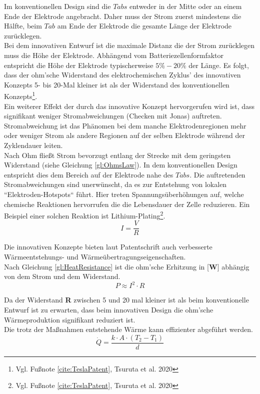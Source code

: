 Im konventionellen Design sind die $Tabs$ entweder in der Mitte oder an einem Ende der Elektrode angebracht. Daher muss der Strom zuerst mindestens die Hälfte, beim $Tab$ am Ende der Elektrode die gesamte Länge der Elektrode zurücklegen. \\
Bei dem innovativen Entwurf ist die maximale Distanz die der Strom zurücklegen muss die Höhe der Elektrode. Abhängend vom Batteriezellenformfaktor entspricht die Höhe der Elektrode typischerweise $5\percent-20\percent$ der Länge. Es folgt, dass der ohm'sche Widerstand des elektrochemischen Zyklus' des innovativen Konzepts 5- bis 20-Mal kleiner ist als der Widerstand des konventionellen Konzepts\footnote{Vgl. Fußnote \ref{cite:TeslaPatent}, Tsuruta et al. 2020}.\\
Ein weiterer Effekt der durch das innovative Konzept hervorgerufen wird ist, dass signifikant weniger Stromabweichungen (Checken mit Jonas) auftreten. Stromabweichung ist das Phänomen bei dem manche Elektrodenregionen mehr oder weniger Strom als andere Regionen auf der selben Elektrode während der Zyklendauer leiten.\\
Nach Ohm fließt Strom bevorzugt entlang der Strecke mit dem geringsten Widerstand (siehe Gleichung \ref{gl:OhmsLaw}). In dem konventionellen Design entspricht dies dem Bereich auf der Elektrode nahe des $Tabs$. Die auftretenden Stromabweichungen sind unerwünscht, da es zur Entstehung von lokalen ``Elektroden-Hotspots`` führt. Hier treten Spannungsüberhöhungen auf, welche chemische Reaktionen hervorrufen die die Lebensdauer der Zelle reduzieren. Ein Beispiel einer solchen Reaktion ist Lithium-Plating\footnote{Vgl. Fußnote \ref{cite:TeslaPatent}, Tsuruta et al. 2020}.
\begin{equation}
	I = \frac{V}{R}
	\label{gl:OhmsLaw}
\end{equation}

Die innovativen Konzepte bieten laut Patentschrift auch verbesserte Wärmeentstehungs- und Wärmeübertragungseigenschaften.\\
Nach Gleichung \ref{gl:HeatResistance} ist die ohm'sche Erhitzung in [\textbf{W}] abhängig von dem Strom und dem Widerstand. 
\begin{equation}
	 P \approx I^{2} \cdot R
	 \label{gl:HeatResistance}
\end{equation}

Da der Widerstand \textbf{R} zwischen 5 und 20 mal kleiner ist als beim konventionelle Entwurf ist zu erwarten, dass beim innovativen Design die ohm'sche Wärmeproduktion signifikant reduziert ist.\\
Die trotz der Maßnahmen entstehende Wärme kann effizienter abgeführt werden.
\begin{equation}
	\dot{Q} = \frac{k\cdot A\cdot (T_{2} - T_{1})}{d}
	\label{gl:HeatTransferEquation}
\end{equation}

